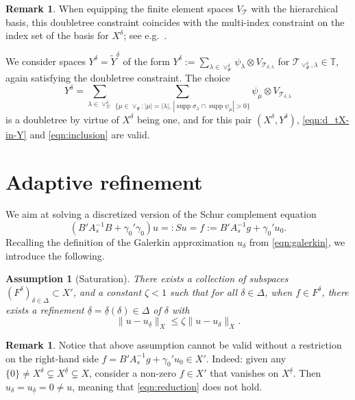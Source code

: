 \documentclass[11pt,a4paper,oneside,english]{amsart}
\numberwithin{equation}{section}
\numberwithin{theorem}{section}
\newtheorem{assum}[theorem]{Assumption}
\theoremstyle{definition}
\newtheorem{remark}[theorem]{Remark}
\DeclareMathOperator{\supp}{supp}
\newcommand{\T}{\mathcal{T}}
\newcommand{\udelta}{{\underline{\delta}}}
\newcommand{\jw}[1]{{\color{red}{JW: #1}}}
\begin{document}
\begin{remark}
  When equipping the finite element spaces $V_{\T}$ with the hierarchical basis,
  this doubletree constraint coincides with the multi-index constraint on the index
  set of the basis for $X^\delta$; see e.g.~\cite{TODO}.
\end{remark}

We consider spaces $Y^\delta = \tilde Y^\delta$ of the form
$Y^\delta := \sum_{\lambda \in \vee^\delta_\Psi} \psi_\lambda \otimes V_{\T_{\delta, \lambda}}$
for $\T_{\vee^\delta_\Psi, \lambda} \in \mathbb T$, again satisfying the doubletree
constraint. The choice
\begin{equation}
  Y^\delta = \sum_{\lambda \in \vee_\Sigma^\delta} \sum_{\{\mu \in \vee_\Psi\colon |\mu|=|\lambda|,\,
  |\supp \sigma_\lambda \cap \supp \psi_\mu|>0\}} \psi_\mu \otimes V_{\T_{\delta,\lambda}}
  \label{eqn:generate-Ydelta}
\end{equation}
is a doubletree by virtue of $X^\delta$ being one, and for this pair $(X^\delta, Y^\delta)$,
\eqref{eqn:d_tX-in-Y} and \eqref{eqn:inclusion} are valid.

\section{Adaptive refinement}
We aim at solving a discretized version of the Schur complement equation
\begin{equation}
  \label{eqn:schur}
 (B' A_s^{-1} B + \gamma_0' \gamma_0)u =: Su = f := B' A_s^{-1}g+\gamma_0' u_0.
\end{equation}
Recalling the definition of the Galerkin approximation $u_\delta$ from \eqref{eqn:galerkin},
we introduce the following.


\begin{assum}[Saturation] \label{assum:saturation}
There exists a collection of subspaces $(F^\delta)_{\delta \in \Delta} \subset X'$, and
a constant $\zeta<1$ such that for all $\delta \in \Delta$, when $f \in F^\delta$,
  there exists a refinement $\udelta = \udelta(\delta) \in \Delta$ of $\delta$ with
\begin{equation}
  \label{eqn:reduction}
  \|u-u_\udelta\|_X \leq \zeta \|u-u_\delta\|_X.
\end{equation}
  \jw{in zekere zin gebruiken we niet dat *er zo'n refinement is*, maar dat *onze* refinement hieraan voldoet, toch?}
\end{assum}
\begin{remark} \label{data-oscillation}
  Notice that above assumption cannot be valid without a restriction on the
  right-hand side $f =B' A_s^{-1}g+\gamma_0' u_0\in X'$. Indeed: given any
  $\{0\} \neq X^\delta \subsetneq X^{\udelta} \subsetneq X$, consider a non-zero
  $f \in X'$ that vanishes on $X^{\udelta}$. Then $u_\delta=u_\udelta=0 \neq u$,
  meaning that \eqref{eqn:reduction} does not hold.
\end{remark}
\end{document}
